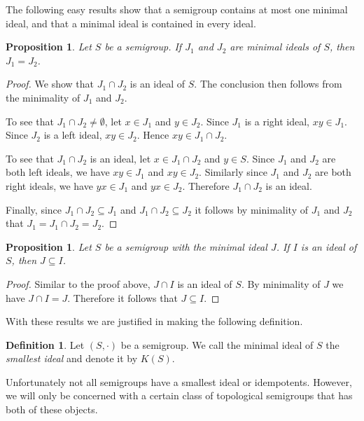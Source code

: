 \documentclass[12pt]{article}
\theoremstyle{plain}
\newtheorem{prop}[thm]{Proposition}
\theoremstyle{definition}
\newtheorem{defn}[thm]{Definition}
\begin{document}
The following easy results show that a semigroup contains at most
one minimal ideal, and that a minimal ideal is contained in every ideal.
\begin{prop}
  Let $S$ be a semigroup.
  If $J_1$ and $J_2$ are minimal ideals of $S$, then $J_1 = J_2$.
\end{prop}
\begin{proof}
  We show that $J_1 \cap J_2$ is an ideal of $S$. 
  The conclusion then follows from the minimality of $J_1$ and $J_2$.
  
  To see that $J_1 \cap J_2 \ne \emptyset$, let $x \in J_1$ and
  $y \in J_2$. 
  Since $J_1$ is a right ideal, $xy \in J_1$. 
  Since $J_2$ is a left ideal, $xy \in J_2$. 
  Hence $xy \in J_1 \cap J_2$. 

  To see that $J_1 \cap J_2$ is an ideal, let $x \in J_1 \cap J_2$ and
  $y \in S$. 
  Since $J_1$ and $J_2$ are both left ideals, we have $xy \in J_1$ and
  $xy \in J_2$.
  Similarly since $J_1$ and $J_2$ are both right ideals, we have $yx
  \in J_1$ and $yx \in J_2$. 
  Therefore $J_1 \cap J_2$ is an ideal.

  Finally, since $J_1 \cap J_2 \subseteq J_1$ and $J_1 \cap J_2
  \subseteq J_2$ it follows by minimality of $J_1$ and $J_2$ that $J_1
  = J_1 \cap J_2 = J_2$.
\end{proof}
\begin{prop}
  Let $S$ be a semigroup with the minimal ideal $J$. 
  If $I$ is an ideal of $S$, then $J \subseteq I$.
\end{prop}
\begin{proof}
  Similar to the proof above, $J \cap I$ is an ideal of $S$. 
  By minimality of $J$ we have $J \cap I = J$. 
  Therefore it follows that $J \subseteq I$.
\end{proof}

With these results we are justified in making the following definition. 
\begin{defn}
  Let $(S,\cdot)$ be a semigroup. 
  We call the minimal ideal of $S$ the \textsl{smallest ideal} and
  denote it by $K(S)$.%
\end{defn}
Unfortunately not all semigroups have a smallest ideal or
idempotents. 
However, we will only be concerned with a certain class of topological
semigroups that has both of these objects.
\end{document}
